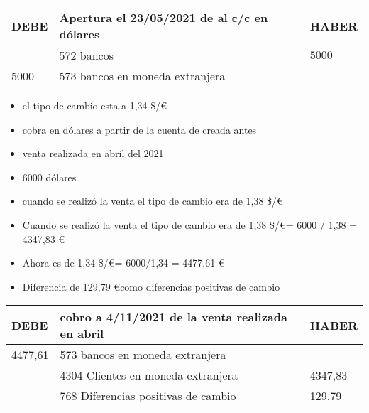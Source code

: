\documentclass[a4paper,12pt]{article}
\newcommand{\mytcolorbox}[1]{
    \begin{tcolorbox}[colback=blue!5!white, colframe=blue!75!black, title=NOTA]
        #1
    \end{tcolorbox}
}
\begin{document}
\begin{table}[H]
    \centering
    \begin{tabular}{|p{3cm}|p{6cm}|p{3cm}|}
    \hline
    \textbf{DEBE} & \textbf{Apertura el 23/05/2021 de al c/c en dólares} & \textbf{HABER} \\
    \hline
    & 572 bancos & $5000$\\
    \hline
    5000 & 573 bancos en moneda extranjera & \\
    \hline
    \end{tabular}
    \end{table}

\begin{itemize}
    \item el tipo de cambio esta a 1,34 \$/\euro
    \item cobra en dólares a partir de la cuenta de creada antes
    \item venta realizada en abril del 2021
    \item 6000 dólares 
    \item cuando se realizó la venta el tipo de cambio era de 1,38 \$/\euro
\end{itemize}

\mytcolorbox{\begin{itemize}
    \item Cuando se realizó la venta el tipo de cambio era de 1,38 \$/\euro = 6000 / 1,38 = 4347,83 \euro
    \item Ahora es de 1,34 \$/\euro = 6000/1,34 = 4477,61 \euro
    \item Diferencia de 129,79 \euro como diferencias positivas de cambio
\end{itemize}}

\begin{table}[H]
    \centering
    \begin{tabular}{|p{3cm}|p{6cm}|p{3cm}|}
    \hline
    \textbf{DEBE} & \textbf{cobro a 4/11/2021 de la venta realizada en abril} & \textbf{HABER} \\
    \hline
    4477,61& 573 bancos en moneda extranjera & \\
    \hline
    & 4304  Clientes en moneda extranjera& 4347,83\\
    \hline
    & 768 Diferencias positivas de cambio& 129,79\\
    \hline
    \end{tabular}
\end{table}
\end{document}
